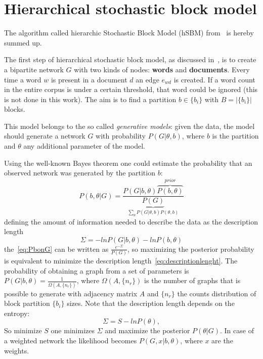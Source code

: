 \appendix
\chapter{Hierarchical stochastic block model}\label{app:hsbm}
The algorithm called hierarchic Stochastic Block Model (hSBM) from~\cite{gerlach2018network} is hereby summed up.

The first step of hierarchical stochastic block model, as discussed in~\cite{peixoto2014efficient}, is to create a bipartite network $G$ with two kinds of nodes: \textbf{words} and \textbf{documents}. Every time a word $w$ is present in a document $d$ an edge $e_{wd}$ is created. If a word count in the entire corpus is under a certain threshold, that word could be ignored (this is not done in this work). The aim is to find a partition $b\in\{b_i\}$ with $B=\left|\{b_i\}\right|$ blocks.

This model belongs to the so called \textit{generative models}: given the data, the model should generate a network $G$ with probability $P(G|\theta, b)$, where $b$ is the partition and $\theta$ any additional parameter of the model.

Using the well-known Bayes theorem one could estimate the probability that an observed network was generated by the partition $b$:
\begin{equation}\label{eq:PbonG}
  P(b,\theta|G)=\frac{P(G|b,\theta)\overbrace{P(b,\theta)}^{prior}}{\underbrace{P(G)}_{\sum_{\theta}P(G|\theta, b)P(\theta, b)}}
\end{equation}
defining the amount of information needed to describe the data as the description length
\begin{equation}\label{eq:descriptionlenght}
  \Sigma=-lnP(G|b,\theta)-lnP(b, \theta)
\end{equation}
the~\ref{eq:PbonG} can be written as $\frac{e^{-\Sigma}}{P(G)}$, so maximizing the posterior probability is equivalent to minimize the description length~\ref{eq:descriptionlenght}. The probability of obtaining a graph from a set of parameters is $P(G|b,\theta)=\frac{1}{\Omega(A,\{n_r\})}$, where $\Omega(A,\{n_r\})$ is the number of graphs that is possible to generate with adjacency matrix $A$ and $\{n_r\}$ the counts distribution of block partition $\{b_i\}$ sizes.
Note that the description length depends on the entropy:
\[
\Sigma=S-lnP(\theta),
\]
So minimize $S$ one minimizes $\Sigma$ and maximize the posterior $P(\theta|G)$.
In case of a weighted network the likelihood becomes $P(G,x|b,\theta)$, where $x$ are the weights.

